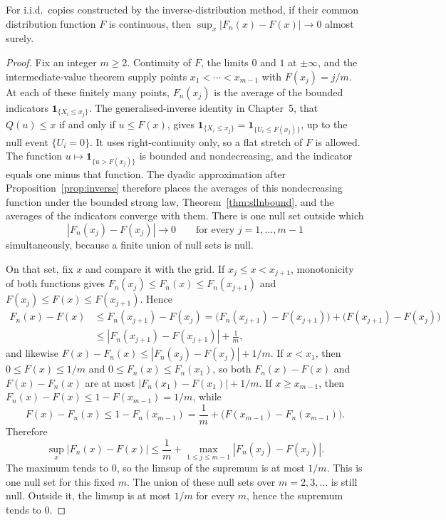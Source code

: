 \begin{theorem}\label{thm:gc}
For i.i.d.\ copies constructed by the inverse-distribution method, if their common distribution function $F$ is continuous, then $\sup_x|F_n(x)-F(x)|\to0$ almost surely.
\end{theorem}
\begin{proof}
Fix an integer $m\ge2$. Continuity of $F$, the limits $0$ and $1$ at $\pm\infty$, and the intermediate-value theorem supply points $x_1<\cdots<x_{m-1}$ with $F(x_j)=j/m$. At each of these finitely many points, $F_n(x_j)$ is the average of the bounded indicators $\mathbf 1_{\{X_i\le x_j\}}$. The generalised-inverse identity in Chapter~5, that $Q(u)\le x$ if and only if $u\le F(x)$, gives $\mathbf 1_{\{X_i\le x_j\}}=\mathbf 1_{\{U_i\le F(x_j)\}}$, up to the null event $\{U_i=0\}$. It uses right-continuity only, so a flat stretch of $F$ is allowed. The function $u\mapsto\mathbf 1_{\{u>F(x_j)\}}$ is bounded and nondecreasing, and the indicator equals one minus that function. The dyadic approximation after Proposition~\ref{prop:inverse} therefore places the averages of this nondecreasing function under the bounded strong law, Theorem~\ref{thm:sllnbound}, and the averages of the indicators converge with them. There is one null set outside which
\[
 |F_n(x_j)-F(x_j)|\to0\qquad\text{for every }j=1,\ldots,m-1
\]
simultaneously, because a finite union of null sets is null.

On that set, fix $x$ and compare it with the grid. If $x_j\le x<x_{j+1}$, monotonicity of both functions gives $F_n(x_j)\le F_n(x)\le F_n(x_{j+1})$ and $F(x_j)\le F(x)\le F(x_{j+1})$. Hence
\begin{align*}
F_n(x)-F(x)
&\le F_n(x_{j+1})-F(x_j)
= \bigl(F_n(x_{j+1})-F(x_{j+1})\bigr)+\bigl(F(x_{j+1})-F(x_j)\bigr)\\
&\le |F_n(x_{j+1})-F(x_{j+1})|+\frac1m,
\end{align*}
and likewise $F(x)-F_n(x)\le |F_n(x_j)-F(x_j)|+1/m$. If $x<x_1$, then $0\le F(x)\le1/m$ and $0\le F_n(x)\le F_n(x_1)$, so both $F_n(x)-F(x)$ and $F(x)-F_n(x)$ are at most $|F_n(x_1)-F(x_1)|+1/m$. If $x\ge x_{m-1}$, then $F_n(x)-F(x)\le 1-F(x_{m-1})=1/m$, while
\[
 F(x)-F_n(x)\le 1-F_n(x_{m-1})=\frac1m+\bigl(F(x_{m-1})-F_n(x_{m-1})\bigr).
\]
Therefore
\[
 \sup_x|F_n(x)-F(x)|
 \le\frac1m+\max_{1\le j\le m-1}|F_n(x_j)-F(x_j)|.
\]
The maximum tends to $0$, so the limsup of the supremum is at most $1/m$. This is one null set for this fixed $m$. The union of these null sets over $m=2,3,\ldots$ is still null. Outside it, the limsup is at most $1/m$ for every $m$, hence the supremum tends to $0$.
\end{proof}

